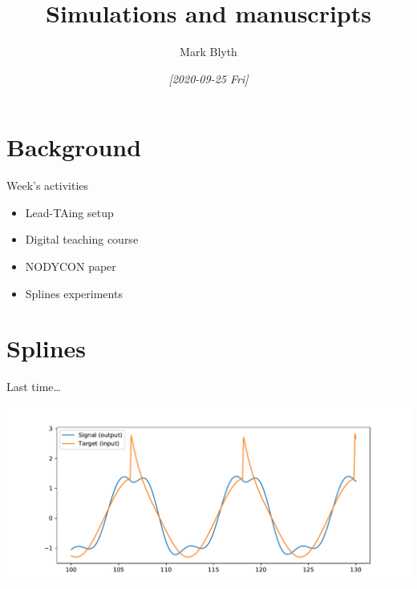 \documentclass[presentation]{beamer}
\author{Mark Blyth}
\date{\textit{[2020-09-25 Fri]}}
\title{Simulations and manuscripts}
\begin{document}
\maketitle

\section{Background}
\label{sec:org7a86749}
\begin{frame}[label={sec:orgf59616e}]{Week's activities}
\begin{itemize}
\item Lead-TAing setup
\end{itemize}
\vfill
\begin{itemize}
\item Digital teaching course
\end{itemize}
\vfill
\begin{itemize}
\item NODYCON paper
\end{itemize}
\vfill
\begin{itemize}
\item Splines experiments
\end{itemize}
\end{frame}

\section{Splines}
\label{sec:org39f815c}
\begin{frame}[label={sec:org36406f9}]{Last time\ldots{}}
\begin{center}
\includegraphics[width=.9\linewidth]{./perturbation.pdf}
\end{center}
\end{frame}
\end{document}
